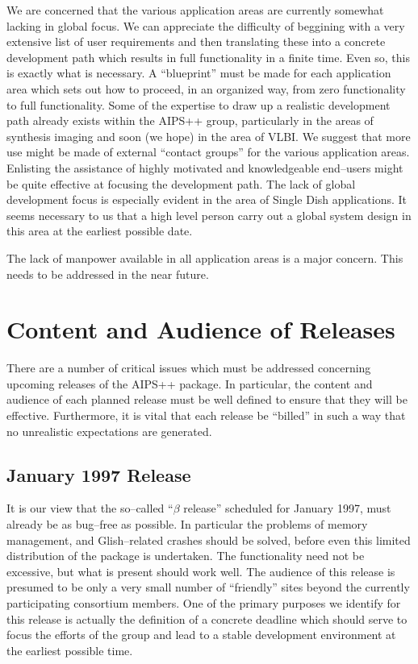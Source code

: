 We are concerned that the various application areas are currently
somewhat lacking in global focus. We can appreciate the difficulty of
beggining with a very extensive list of user requirements and then
translating these into a concrete development path which results in
full functionality in a finite time. Even so, this is exactly what is
necessary. A ``blueprint'' must be made for each application area
which sets out how to proceed, in an organized way, from zero
functionality to full functionality.  Some of the expertise to draw up
a realistic development path already exists within the AIPS++ group,
particularly in the areas of synthesis imaging and soon (we hope) in
the area of VLBI.  We suggest that more use might be made of external
``contact groups'' for the various application areas. Enlisting the
assistance of highly motivated and knowledgeable end--users might be
quite effective at focusing the development path.  The lack of global
development focus is especially evident in the area of Single Dish
applications. It seems necessary to us that a high level person carry
out a global system design in this area at the earliest possible date.

The lack of manpower available in all application areas is a major
concern. This needs to be addressed in the near future.


\section{Content and Audience of Releases}

There are a number of critical issues which must be addressed
concerning upcoming releases of the AIPS++ package. In particular, the
content and audience of each planned release must be well defined to
ensure that they will be effective. Furthermore, it is vital that each
release be ``billed'' in such a way that no unrealistic expectations
are generated. 

\subsection{January 1997 Release}

It is our view that the so--called ``$\beta$ release'' scheduled for
January 1997, must already be as bug--free as possible. In particular
the problems of memory management, and Glish--related crashes should be
solved, before even this limited distribution of the package is
undertaken. The functionality need not be excessive, but what is
present should work well. The audience of this release is presumed to
be only a very small number of ``friendly'' sites beyond the currently
participating consortium members. One of the primary purposes we
identify for this release is actually the definition of a concrete
deadline which should serve to focus the efforts of the group and lead
to a stable development environment at the earliest possible time.

